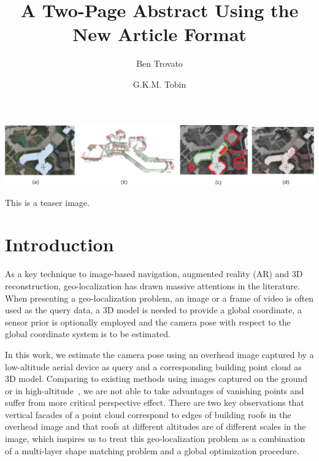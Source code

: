 \documentclass[sigconf,review,anonymous]{acmart}
\begin{document}
\title{A Two-Page Abstract Using the New Article Format}

\author{Ben Trovato}

\author{G.K.M. Tobin}

\renewcommand{\shortauthors}{B. Trovato et. al.}

\begin{teaserfigure}
  \includegraphics[width=\textwidth]{figures/teaser_pdf}
  \caption{This is a teaser image.}
  \label{fig:teaser}
\end{teaserfigure}


\maketitle

\section{Introduction}
%
As a key technique to image-based navigation, augmented reality (AR) and 3D reconstruction, geo-localization has drawn massive attentions in the literature. When presenting a geo-localization problem, an image or a frame of video is often used as the query data, a 3D model is needed to provide a global coordinate, a sensor prior is optionally employed and the camera pose with respect to the global coordinate system is to be estimated. 

In this work, we estimate the camera pose using an overhead image captured by a low-altitude aerial device as query and a corresponding building point cloud as 3D model. Comparing to existing methods using images captured on the ground~\cite{instant} or in high-altitude~\cite{FDCM}, we are not able to take advantages of vanishing points and suffer from more critical perspective effect. There are two key observations that vertical facades of a point cloud correspond to edges of building roofs in the overhead image and that roofs at different altitudes are of different scales in the image, which inspires us to treat this geo-localization problem as a combination of a multi-layer shape matching problem and a global optimization procedure. 
%
\end{document}
